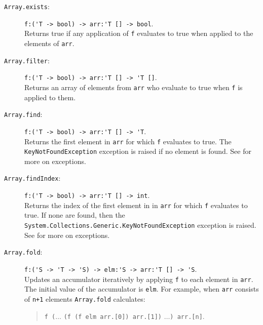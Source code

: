 \documentclass[springer.tex]{subfiles}
\begin{document}
\begin{description}
\item[\texttt{Array.exists}:] \lstinline{f:('T -> bool) -> arr:'T [] -> bool}.~\\
  Returns true if any application of \lstinline{f} evaluates to true when applied to the elements of \lstinline{arr}.
\item[\texttt{Array.filter}:] \lstinline{f:('T -> bool) -> arr:'T [] -> 'T []}.~\\
  Returns an array of elements from \lstinline{arr} who evaluate to true when \lstinline{f} is applied to them.
\item[\texttt{Array.find}:] \lstinline{f:('T -> bool) -> arr:'T [] -> 'T}.~\\
  Returns the first element in \lstinline{arr} for which \lstinline{f} evaluates to true. The \lstinline{KeyNotFoundException} exception is raised if no element is found.  See  for more on exceptions.
    
\item[\texttt{Array.findIndex}:] \lstinline{f:('T -> bool) -> arr:'T [] -> int}.~\\
  Returns the index of the first element in in \lstinline{arr} for which \lstinline{f} evaluates to true. If none are found, then the \lstinline{System.Collections.Generic.KeyNotFoundException} exception is raised.  See  for more on exceptions.
\item[\texttt{Array.fold}:] \lstinline{f:('S -> 'T -> 'S) -> elm:'S -> arr:'T [] -> 'S}.~\\
  Updates an accumulator iteratively by applying \lstinline{f} to each element in \lstinline{arr}. The initial value of the accumulator is \lstinline{elm}. For example, when \lstinline{arr} consists of \lstinline{n+1} elements
  \lstinline{Array.fold} calculates:
  \begin{quote}
    \lstinline{f (}$\ldots$ \lstinline{(f (f elm arr.[0]) arr.[1])} $\ldots$\lstinline{) arr.[n]}.

\end{quote}
\end{description}
\end{document}
